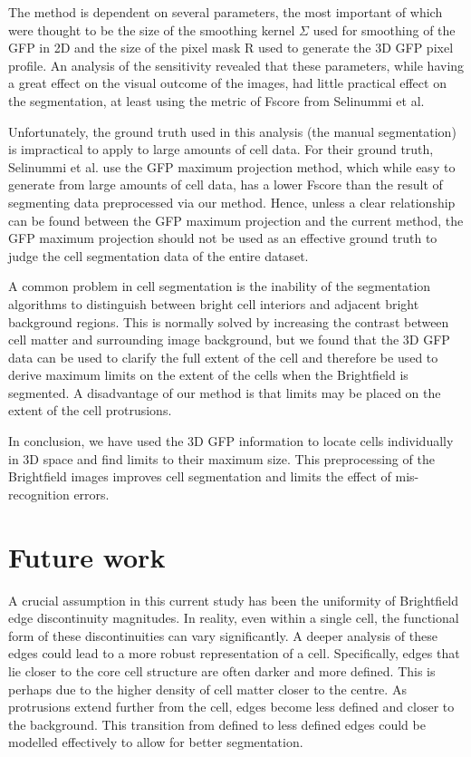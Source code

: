 The method is dependent on several parameters, the most important of which were thought to be the size of the smoothing kernel $\Sigma$ used for smoothing of the GFP in 2D and the size of the pixel mask R used to generate the 3D GFP pixel profile. An analysis of the sensitivity revealed that these parameters, while having a great effect on the visual outcome of the images, had little practical effect on the segmentation, at least using the metric of Fscore from Selinummi et al.

Unfortunately, the ground truth used in this analysis (the manual segmentation) is impractical to apply to large amounts of cell data. For their ground truth, Selinummi et al. use the GFP maximum projection method, which while easy to generate from large amounts of cell data, has a lower Fscore than the result of segmenting data preprocessed via our method. Hence, unless a clear relationship can be found between the GFP maximum projection and the current method, the GFP maximum projection should not be used as an effective ground truth to judge the cell segmentation data of the entire dataset.

A common problem in cell segmentation is the inability of the segmentation algorithms to distinguish between bright cell interiors and adjacent bright background regions. This is normally solved by increasing the contrast between cell matter and surrounding image background, but we found that the 3D GFP data can be used to clarify the full extent of the cell and therefore be used to derive maximum limits on the extent of the cells when the Brightfield is segmented. A disadvantage of our method is that limits may be placed on the extent of the cell protrusions.

In conclusion, we have used the 3D GFP information to locate cells individually in 3D space and find limits to their maximum size. This preprocessing of the Brightfield images improves cell segmentation and limits the effect of mis-recognition errors.

\section{Future work}

A crucial assumption in this current study has been the uniformity of Brightfield edge discontinuity magnitudes. In reality, even within a single cell, the functional form of these discontinuities can vary significantly. A deeper analysis of these edges could lead to a more robust representation of a cell. Specifically, edges that lie closer to the core cell structure are often darker and more defined. This is perhaps due to the higher density of cell matter closer to the centre. As protrusions extend further from the cell, edges become less defined and closer to the background. This transition from defined to less defined edges could be modelled effectively to allow for better segmentation.

